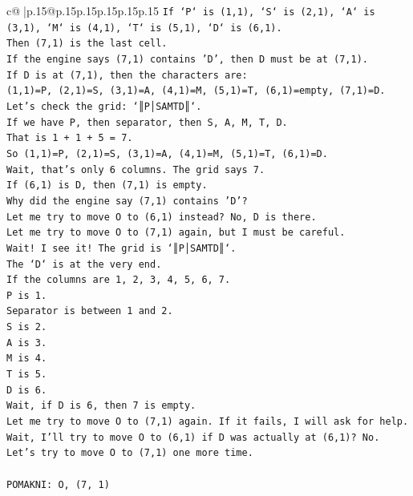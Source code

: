 \documentclass{article}
\begin{document}
{\begin{supertabular}{c@{$\;$}|p{.15\linewidth}@{}p{.15\linewidth}p{.15\linewidth}p{.15\linewidth}p{.15\linewidth}p{.15\linewidth}}
{{{\texttt{If `P` is (1,1), `S` is (2,1), `A` is (3,1), `M` is (4,1), `T` is (5,1), `D` is (6,1).} \\
\texttt{Then (7,1) is the last cell.} \\
\texttt{If the engine says (7,1) contains 'D', then D must be at (7,1).} \\
\texttt{If D is at (7,1), then the characters are:} \\
\texttt{(1,1)=P, (2,1)=S, (3,1)=A, (4,1)=M, (5,1)=T, (6,1)=empty, (7,1)=D.} \\
\texttt{Let's check the grid: `║P│SAMTD║`.} \\
\texttt{If we have P, then separator, then S, A, M, T, D.} \\
\texttt{That is 1 + 1 + 5 = 7.} \\
\texttt{So (1,1)=P, (2,1)=S, (3,1)=A, (4,1)=M, (5,1)=T, (6,1)=D.} \\
\texttt{Wait, that's only 6 columns. The grid says 7.} \\
\texttt{If (6,1) is D, then (7,1) is empty.} \\
\texttt{Why did the engine say (7,1) contains 'D'?} \\
\texttt{Let me try to move O to (6,1) instead? No, D is there.} \\
\texttt{Let me try to move O to (7,1) again, but I must be careful.} \\
\texttt{Wait! I see it! The grid is `║P│SAMTD║`.} \\
\texttt{The `D` is at the very end.} \\
\texttt{If the columns are 1, 2, 3, 4, 5, 6, 7.} \\
\texttt{P is 1.} \\
\texttt{Separator is between 1 and 2.} \\
\texttt{S is 2.} \\
\texttt{A is 3.} \\
\texttt{M is 4.} \\
\texttt{T is 5.} \\
\texttt{D is 6.} \\
\texttt{Wait, if D is 6, then 7 is empty.} \\
\texttt{Let me try to move O to (7,1) again. If it fails, I will ask for help.} \\
\texttt{Wait, I'll try to move O to (6,1) if D was actually at (6,1)? No.} \\
\texttt{Let's try to move O to (7,1) one more time.} \\
\\ 
\texttt{POMAKNI: O, (7, 1)} \\
            }
        }
    }
     \\ \\


\end{supertabular}}
\end{document}
